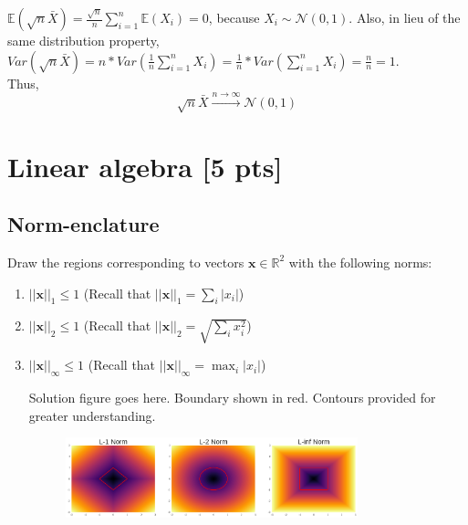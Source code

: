 \documentclass[a4paper]{article}
\theoremstyle{definition}
\newcommand{\RR}{\mathbb{R}}
\newenvironment{soln}{
    \leavevmode\color{blue}\ignorespaces
}{}
\begin{document}
\begin{enumerate}
\begin{soln}
	$\mathbb{E}(\sqrt{n}\bar{X}) = \frac{\sqrt{n}}{n}\sum_{i=1}^n \mathbb{E}(X_i)  = 0$, because $X_i\sim\mathcal{N}(0, 1)$. Also, in lieu of the same distribution property, \\
	
	$Var(\sqrt{n}\bar{X}) = n * Var(\frac{1}{n}\sum_{i=1}^n X_i) = \frac{1}{n} * Var(\sum_{i=1}^n X_i) = \frac{n}{n} = 1$. \\
	
	Thus, $$\sqrt{n}\bar{X}\overset{n\rightarrow\infty}{\longrightarrow}\mathcal{N}(0, 1)$$
\end{soln}
  
\end{enumerate}



\section{Linear algebra [5 pts]}


\subsection{Norm-enclature}
Draw the regions corresponding to vectors $\mathbf{x}\in\RR^2$ with the following norms:
\begin{enumerate}
	\item 	$||\mathbf{x}||_1\leq 1$ (Recall that $||\mathbf{x}||_1 = \sum_i |x_i|$)
	\item 	$||\mathbf{x}||_2 \leq 1$ (Recall that $||\mathbf{x}||_2 =\sqrt{\sum_i x_i^2}$)
	\item 	$||\mathbf{x}||_\infty \leq 1$ (Recall that $||\mathbf{x}||_\infty = \max_i |x_i|$)
	
	\begin{soln}
	    Solution figure goes here. Boundary shown in red. Contours provided for greater understanding.\\
	    \begin{figure}[h!]
	        \centering
	        \includegraphics[width=0.8\textwidth]{norm.png}  
	        \captionsetup{labelformat=empty}
	        \caption{}
	        \label{fig:my_label}
	    \end{figure}
	\end{soln}
\end{enumerate}
\end{document}
